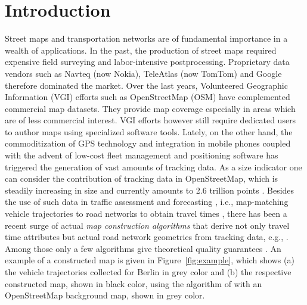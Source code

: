 \documentclass[natbib]{svjour3}                    \smartqed  \usepackage[table]{xcolor}
\begin{document}
\section{Introduction}
\label{sec:introduction}

Street maps and transportation networks are of fundamental importance in a wealth of applications. In the past, the production of street maps required expensive field surveying and labor-intensive postprocessing. Proprietary data vendors such as Navteq (now Nokia), TeleAtlas (now TomTom) and Google therefore dominated the market. 
Over the last years, Volunteered Geographic Information (VGI) \cite{goodchild07} efforts such as OpenStreetMap (OSM) \cite{hw-osmugsm-08, osm:lk} have complemented commercial map datasets. They provide map coverage especially in areas which are of less commercial interest. VGI efforts however still require dedicated users to author maps using specialized software tools.  
Lately, on the other hand, the commoditization of GPS technology and integration in mobile phones coupled with the advent of low-cost fleet management and positioning software has triggered the generation of vast amounts of tracking data. As a size indicator one can consider the contribution of tracking data in OpenStreetMap, which is steadily increasing in size and currently amounts to 2.6 trillion points \cite{osmplanet}. 
Besides the use of such data in traffic assessment and forecasting \cite{efentakis13b}, i.e., map-matching vehicle trajectories to road networks to obtain travel times \cite{Brakatsoulas05onmap-matching}, there has been a recent surge of actual \emph{map construction algorithms} that derive not only travel time attributes but actual road network geometries from tracking data, e.g., \cite{Aanjaneya:2011,Agamennoni:2011:RIP:2218592.2218957,csm_esa2012,be-irmgp-12,Biagioni:2012:MIF:2424321.2424333,bruntrup:2005:imgg,Cao:2009:GTR:1653771.1653776,chen:2008:rdmg,chen:2010:rnr,Davies:2006:SDR:1175887.1176088,edelkamp:2003:rpmi,fathi:2010:dri,DBLP:conf/nips/GeSBW11,DBLP:conf/igarss/GuoIK07,jang:2010:mgs,Karagiorgou:2012:VTD:2424321.2424334,Liu:2012:MLS:2339530.2339637,schroedl:2004:mgtm,shi:2009:agm,sten:2011:mga,Worrall:2007:automatedprocess,DBLP:conf/gis/ZhangTS10}. Among those only a few algorithms give theoretical quality guarantees \cite{Aanjaneya:2011,csm_esa2012,chen:2010:rnr}.
An example of a constructed map is given in Figure~\ref{fig:example}, which shows (a) the vehicle trajectories collected for Berlin in grey color and (b) the respective constructed map, shown in black color, using the algorithm of \cite{Karagiorgou:2012:VTD:2424321.2424334} with an OpenStreetMap background map, shown in grey color.
\end{document}
